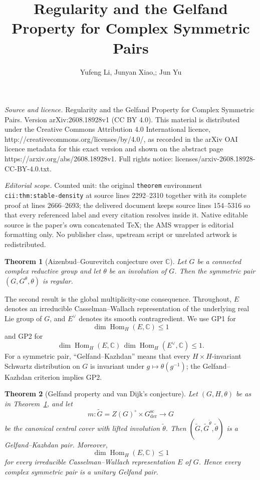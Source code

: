 \documentclass[10pt,a4paper]{amsart}
\numberwithin{equation}{section}
\newtheorem{theorem}{Theorem}[section]
\newcommand{\C}{\mathbb C}
\newcommand{\Hom}{\operatorname{Hom}}
\begin{document}
\title[Regularity and the Gelfand Property for Complex Symmetric Pa]{Regularity and the Gelfand Property for Complex Symmetric Pairs}
\author{Yufeng Li, Junyan Xiao,; Jun Yu}
\date{}
\maketitle
\noindent\emph{Source and licence.} Regularity and the Gelfand Property for Complex Symmetric Pairs. Version arXiv:2608.18928v1 (CC BY 4.0). This material is distributed under the Creative Commons Attribution 4.0 International licence, http://creativecommons.org/licenses/by/4.0/, as recorded in the arXiv OAI licence metadata for this exact version and shown on the abstract page https://arxiv.org/abs/2608.18928v1. Full rights notice: licenses/arxiv-2608.18928-CC-BY-4.0.txt.\par\smallskip
\noindent\textit{Editorial scope.} Counted unit: the original \texttt{theorem} environment \texttt{cii:thm:stable-density} at source lines 2292--2310 together with its complete proof at lines 2666--2693; the delivered document keeps source lines 154--5316 so that every referenced label and every citation resolves inside it. Native editable source is the paper's own concatenated TeX; the AMS wrapper is editorial formatting only. No publisher class, upstream script or unrelated artwork is redistributed.
\begin{theorem}[Aizenbud--Gourevitch conjecture over $\C$]\label{thm:regularity-all}
Let $G$ be a connected complex reductive group and let $\theta$ be an
involution of $G$.  Then the symmetric pair $(G,G^\theta,\theta)$ is regular.
\end{theorem}

The second result is the global multiplicity-one consequence.  Throughout,
$E$ denotes an irreducible Casselman--Wallach representation of the underlying
real Lie group of $G$, and $E^\vee$ denotes its smooth contragredient.  We use
GP1 for
\[
  \dim\Hom_H(E,\C)\leq1
\]
and GP2 for
\[
  \dim\Hom_H(E,\C)\,\dim\Hom_H(E^\vee,\C)\leq1.
\]
For a symmetric pair, ``Gelfand--Kazhdan'' means that every
$H\times H$-invariant Schwartz distribution on $G$ is invariant under
$g\mapsto\theta(g^{-1})$; the Gelfand--Kazhdan criterion implies GP2.

\begin{theorem}[Gelfand property and van Dijk's conjecture]\label{thm:gelfand-all}
Let $(G,H,\theta)$ be as in Theorem~\ref{thm:regularity-all}, and let
\[
 m:\widetilde G=Z(G)^\circ\times G_{\mathrm{der}}^{\mathrm{sc}}
   \longrightarrow G
\]
be the canonical central cover with lifted involution $\widetilde\theta$.
Then $(\widetilde G,\widetilde G^{\widetilde\theta},\widetilde\theta)$
is a Gelfand--Kazhdan pair.  Moreover,
\[
  \dim\Hom_H(E,\C)\leq 1
\]
for every irreducible Casselman--Wallach representation $E$ of $G$.  Hence every
complex symmetric pair is a unitary Gelfand pair.
\end{theorem}
\end{document}
